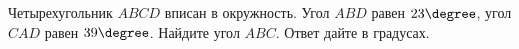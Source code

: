 \begin{ex}
	\begin{condition}
		Четырехугольник \( ABCD  \) вписан в окружность. Угол \( ABD  \) равен \( 23  \degree\), угол \( CAD  \) равен \( 39  \degree\). Найдите угол \( ABC \). Ответ дайте в градусах.
	\end{condition}
\end{ex}